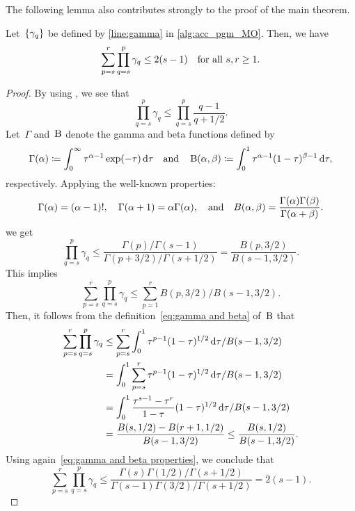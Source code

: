 \documentclass[../main]{subfiles}
\begin{document}
The following lemma also contributes strongly to the proof of the main theorem.
\begin{lemma} \label{thm:prod}
    Let~$\set*{\gamma_q}$ be defined by \cref{line:gamma} in \cref{alg:acc_pgm_MO}.
    Then, we have
    \[
        \sum_{p = s}^r \prod_{q = s}^p \gamma_q \le 2 ( s - 1) \forallcondition{s, r \ge 1}
    .\] 
\end{lemma}
\begin{proof}
    By using , we see that
    \[
        \prod_{q = s}^{p} \gamma_q \le \prod_{q = s}^{p} \frac{q - 1}{q + 1 / 2} 
    .\]
    Let~$\Gamma$ and~$\Beta$ denote the gamma and beta functions defined by
    \[ \label{eq:gamma and beta}
        \Gamma(\alpha) \coloneqq \int_{0}^{\infty} \tau^{\alpha - 1} \exp(-\tau) \odif{\tau} \eqand
        \Beta(\alpha, \beta) \coloneqq \int_{0}^{1} \tau^{\alpha - 1} (1 - \tau)^{\beta - 1} \odif{\tau}
    ,\]
    respectively.
    Applying the well-known properties:
    \[ \label{eq:gamma and beta properties}
        \Gamma(\alpha) = (\alpha - 1)!, \quad \Gamma(\alpha + 1) = \alpha \Gamma(\alpha), \eqand B(\alpha, \beta) = \frac{\Gamma(\alpha) \Gamma(\beta)}{\Gamma(\alpha + \beta)}
    .\]
    we get
    \[
        \prod_{q = s}^{p} \gamma_q \le \frac{\Gamma(p) / \Gamma(s - 1)}{\Gamma(p + 3 / 2) / \Gamma(s + 1 / 2)}
        = \frac{B(p, 3 / 2)}{B(s - 1, 3 / 2)}
    .\] 
    This implies
    \[
        \sum_{p = s}^{r} \prod_{q = s}^{p} \gamma_q \le \sum_{p = 1}^{r} B(p, 3 / 2) / B(s - 1, 3 / 2)
    .\] 
    Then, it follows from the definition~\cref{eq:gamma and beta} of~$\Beta$ that
    \[
        \begin{split}
            \sum_{p = s}^{r} \prod_{q = s}^{p} \gamma_q 
        &\le \sum_{p = s}^{r} \int_{0}^{1} \tau^{p - 1} (1 - \tau)^{1 / 2} \odif{\tau} / B(s - 1, 3 / 2) \\
        &= \int_{0}^{1} \sum_{p = s}^{r} \tau^{p - 1} (1 - \tau)^{1 / 2} \odif{\tau} / B(s - 1, 3 / 2) \\
        &= \int_{0}^{1} \frac{\tau^{s - 1} - \tau^r}{1 - \tau} (1 - \tau)^{1 / 2} \odif{\tau} / B(s - 1, 3 / 2) \\
        &= \frac{B(s, 1 / 2) - B(r + 1, 1 / 2)}{B(s - 1, 3 / 2)} 
        \le \frac{B(s, 1 / 2)}{B(s - 1, 3 / 2)}
        .\end{split}
    \] 
    Using again~\cref{eq:gamma and beta properties}, we conclude that
    \[
        \sum_{p = s}^{r} \prod_{q = s}^{p} \gamma_q
        \le \frac{\Gamma(s) \Gamma(1 / 2) / \Gamma(s + 1 / 2)}{\Gamma(s - 1) \Gamma(3 / 2) / \Gamma(s + 1 / 2)}
        = 2 (s - 1)
    .\] 
\end{proof}
\end{document}

